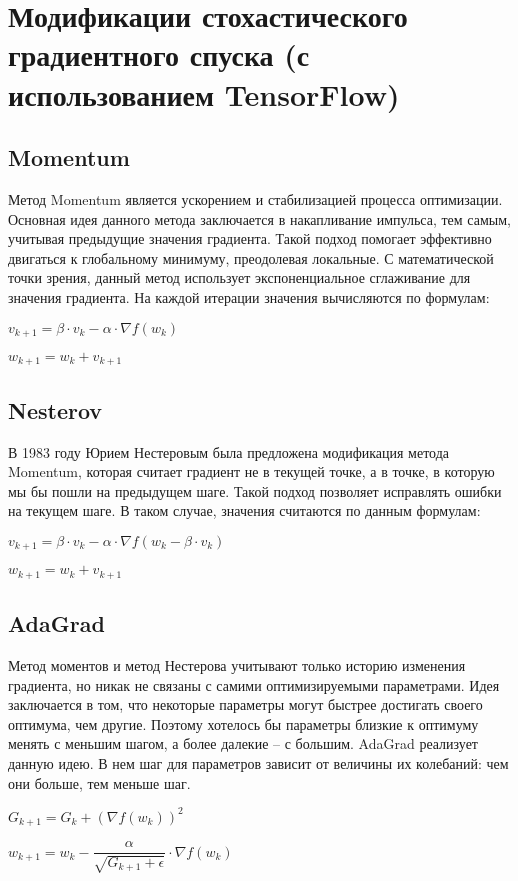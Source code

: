 \documentclass{article}
\begin{document}
\section*{Модификации стохастического градиентного спуска (с использованием TensorFlow)}
\subsection*{Momentum}
Метод Momentum является ускорением и стабилизацией процесса оптимизации. Основная идея данного метода заключается в накапливание импульса, тем самым, учитывая предыдущие значения градиента. Такой подход помогает эффективно двигаться к глобальному минимуму, преодолевая локальные. С математической точки зрения, данный метод использует экспоненциальное сглаживание для значения градиента. На каждой итерации значения вычисляются по формулам:
\begin{center}
    $v_{k+1} = \beta \cdot v_k - \alpha \cdot \nabla f(w_k)$
\end{center}
\begin{center}
    $w_{k+1} = w_k + v_{k+1}$
\end{center}
\subsection*{Nesterov}
В 1983 году Юрием Нестеровым была предложена модификация метода Momentum, которая считает градиент не в текущей точке, а в точке, в которую мы бы пошли на предыдущем шаге. Такой подход позволяет исправлять ошибки на текущем шаге. В таком случае, значения считаются по данным формулам:
\begin{center}
    $v_{k+1} = \beta \cdot v_k - \alpha \cdot \nabla f(w_k - \beta \cdot v_k)$
\end{center}
\begin{center}
    $w_{k+1} = w_k + v_{k+1}$
\end{center}
\subsection*{AdaGrad}
Метод моментов и метод Нестерова учитывают только историю изменения градиента, но никак не связаны с самими оптимизируемыми параметрами. Идея заключается в том, что некоторые параметры могут быстрее достигать своего оптимума, чем другие. Поэтому хотелось бы параметры близкие к оптимуму менять с меньшим шагом, а более далекие – с большим.
AdaGrad реализует данную идею. В нем шаг для параметров зависит от величины их колебаний: чем они больше, тем меньше шаг. 
\begin{center}
    $G_{k+1} = G_k + (\nabla f(w_k))^2$
\end{center}
\begin{center}
    $w_{k+1} = w_k - \dfrac{\alpha}{\sqrt{G_{k+1} + \epsilon}} \cdot \nabla f(w_k)$
\end{center}
\end{document}
